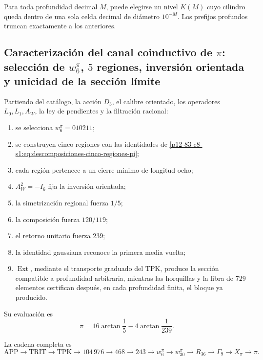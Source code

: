 Para toda profundidad decimal \(M\), puede elegirse un nivel \(K(M)\) cuyo
cilindro queda dentro de una sola celda decimal de diámetro \(10^{-M}\).
Los prefijos profundos truncan exactamente a los anteriores.

\subsection{Caracterización del canal coinductivo de \(\pi\): selección de \(w_6^\pi\), \(5\) regiones, inversión orientada y unicidad de la sección límite}

\begin{theorem}
\label{p12-83-c8-s1:thm:caracterizacion-final-pi-autonoma}
Partiendo del catálogo, la acción \(D_3\), el calibre orientado, los
operadores \(L_0,L_1,A_W\), la ley de pendientes y la filtración racional:
\begin{enumerate}
 \item se selecciona \(w_6^\pi=010211\);
 \item se construyen cinco regiones con las identidades de
       \eqref{p12-83-c8-s1:eq:descomposiciones-cinco-regiones-pi};
 \item cada región pertenece a un cierre mínimo de longitud ocho;
 \item \(A_W^2=-I_6\) fija la inversión orientada;
 \item la simetrización regional fuerza \(1/5\);
 \item la composición fuerza \(120/119\);
 \item el retorno unitario fuerza \(239\);
 \item la identidad gaussiana reconoce la primera media vuelta;
 \item \(\operatorname{Ext}\), mediante el transporte graduado del TPK,
       produce la sección compatible a profundidad arbitraria, mientras las
       horquillas y la fibra de \(729\) elementos certifican después, en cada
       profundidad finita, el bloque ya producido.
\end{enumerate}
Su evaluación es
\[
 \boxed{\pi=16\arctan\frac15-4\arctan\frac1{239}.}
\]
\end{theorem}

La cadena completa es
\[
 \mathrm{APP}\to\mathrm{TRIT}\to\mathrm{TPK}
 \to104\,976\to468\to243\to w_6^\pi
 \to w_{30}^\pi\to R_{36}\to\Gamma_9
 \to X_\pi\to\pi.
\]


